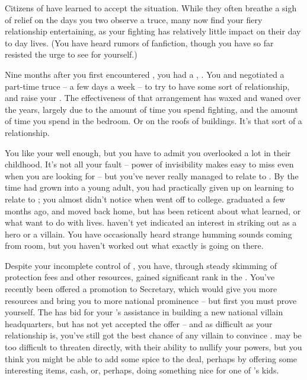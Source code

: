 \documentclass[char]{LRSguildcamp1}
\begin{document}
Citizens of \pCityO{} have learned to accept the situation. While they often breathe a sigh of relief on the days you two observe a truce, many now find your fiery relationship entertaining, as your fighting has relatively little impact on their day to day lives.  (You have heard rumors of fanfiction, though you have so far resisted the urge to see for yourself.)

Nine months after you first encountered \cOS{}, you had a \cGrad{\offspring}, \cGrad{\intro}.  
You and \cOS{} negotiated a part-time truce -- a few days a week -- to try to have some sort of relationship, and raise your \cGrad{\offspring}.  
The effectiveness of that arrangement has waxed and waned over the years, largely due to the amount of time you spend fighting, and the amount of time you spend in the bedroom.  
Or on the roofs of buildings.  
It's that sort of a relationship.  

You like your \cGrad{\offspring} well enough, but you have to admit you overlooked \cGrad{\them} a lot in their childhood.  
It's not all your fault -- \cGrad{\their} power of invisibility makes \cGrad{\them} easy to miss even when you are looking for \cGrad{\them} -- but you've never really managed to relate to \cGrad{\them}.  
By the time \cGrad{\they} had grown into a young adult, you had practically given up on learning to relate to \cGrad{\them}; you almost didn't notice when \cGrad{} went off to college.  
\cGrad{\They} graduated a few months ago, and moved back home, but has been reticent about what \cGrad{\they} learned, or what \cGrad{\they} want to do with \cGrad{\their} lives.  \cGrad{\They} haven't yet indicated an interest in striking out as a hero or a villain.  
You have occasionally heard strange humming sounds coming from \cGrad{\their} room, but you haven't worked out what exactly is going on there. %

Despite your incomplete control of \pCityO{}, you have, through steady skimming of protection fees and other resources, gained significant rank in the \cVillainCompact{\intro}.  You've recently been offered a promotion to Secretary, which would give you more resources and bring you to more national prominence -- but first you must prove yourself.  The \cVillainCompact{} has bid for your \cArchitect{\sibling} \cArchitect{}'s assistance in building a new national villain headquarters, but \cArchitect{} has not yet accepted the offer -- and as difficult as your relationship is, you've still got the best chance of any villain to convince \cArchitect{\them}.  \cArchitect{} may be too difficult to threaten directly, with their ability to nullify your powers, but you think you might be able to add some spice to the deal, perhaps by offering some interesting items, cash, or, perhaps, doing something nice for one of \cArchitect{}'s kids.  
\end{document}
